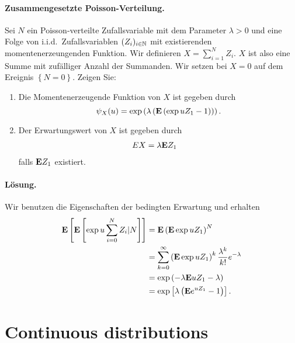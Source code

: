 \paragraph{Zusammengesetzte Poisson-Verteilung.}
Sei $N$ ein Poisson-verteilte Zufallsvariable mit dem Parameter $\lambda>0$ und
eine Folge von i.i.d.\ Zufallsvariablen $(Z_i)_{i\in\mathbb N}$ mit existierenden
momentenerzeungenden Funktion. Wir definieren $X = \sum_{i=1}^{N} Z_i$. $X$ ist
also eine Summe mit zufälliger Anzahl der Summanden. Wir setzen bei $X=0$ auf
dem Ereignis $\left\{ N=0 \right\}$. Zeigen Sie:
\begin{enumerate}
    \item Die Momentenerzeugende Funktion von $X$ ist gegeben durch
        \begin{equation*}
            \psi_X(u) = \exp \left( \lambda \left( 
            \mathbf{E} \left( \exp uZ_1 -1 \right)
            \right) \right).
        \end{equation*}
    \item Der Erwartungswert von $X$ ist gegeben durch
        \begin{align*}
            E X &= \lambda \mathbf{E} Z_1 
        \end{align*}
        falls $\mathbf{E} Z_1$ existiert. 
\end{enumerate}

\paragraph*{Lösung.} Wir benutzen die Eigenschaften der bedingten Erwartung und erhalten
\begin{align*}
    \mathbf{E} \left[ \mathbf{E} \left[ \exp u \sum_{i=0}^{N} Z_i | N \right] \right] &= 
    \mathbf{E} \left( \mathbf{E} \exp uZ_1 \right)^N \\
    &= \sum_{k=0}^{\infty} \left( \mathbf{E} \exp u Z_1 \right)^k \frac{\lambda^k}{k!} e^{-\lambda} \\
    &= \exp \left( -\lambda \mathbf{E} u Z_1  - \lambda\right)  \\
    &= \exp \left[  \lambda\left( \mathbf{E} e^{uZ_1} -1 \right)  \right].
\end{align*}





\section{Continuous distributions}

